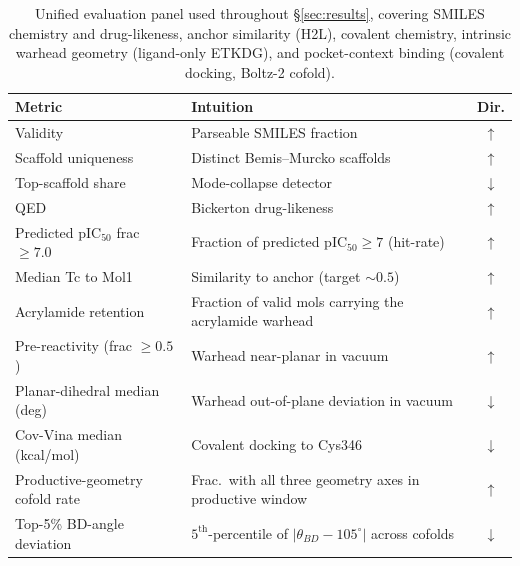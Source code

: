\begin{table}[!ht]
\caption{Unified evaluation panel used throughout \S\ref{sec:results}, covering SMILES chemistry and drug-likeness, anchor similarity (H2L), covalent chemistry, intrinsic warhead geometry (ligand-only ETKDG), and pocket-context binding (covalent docking, Boltz-2 cofold).}
\label{tab:metric_panel}
\centering
\footnotesize
\setlength{\tabcolsep}{6pt}
\renewcommand{\arraystretch}{1.1}
\begin{tabular}{@{}l l c@{}}
\toprule
\textbf{Metric} & \textbf{Intuition} & \textbf{Dir.} \\
\midrule
Validity                              & Parseable SMILES fraction                       & $\uparrow$ \\
Scaffold uniqueness                   & Distinct Bemis--Murcko scaffolds                & $\uparrow$ \\
Top-scaffold share                    & Mode-collapse detector                          & $\downarrow$ \\
QED                                   & Bickerton drug-likeness \cite{bickerton2012qed} & $\uparrow$ \\
Predicted pIC$_{50}$ frac $\ge 7.0$   & Fraction of predicted pIC$_{50}\ge 7$ (hit-rate) & $\uparrow$ \\
Median Tc to Mol1                     & Similarity to anchor (target $\sim 0.5$)        & $\uparrow$ \\
Acrylamide retention                  & Fraction of valid mols carrying the acrylamide warhead & $\uparrow$ \\
Pre-reactivity (frac $\ge 0.5$)       & Warhead near-planar in vacuum                   & $\uparrow$ \\
Planar-dihedral median (deg)          & Warhead out-of-plane deviation in vacuum        & $\downarrow$ \\
Cov-Vina median (kcal/mol)            & Covalent docking to Cys346                      & $\downarrow$ \\
Productive-geometry cofold rate       & Frac.\ with all three geometry axes in productive window & $\uparrow$ \\
Top-5\% BD-angle deviation            & $5^{\text{th}}$-percentile of $|\theta_{BD}{-}105^\circ|$ across cofolds & $\downarrow$ \\
\bottomrule
\end{tabular}
\end{table}

